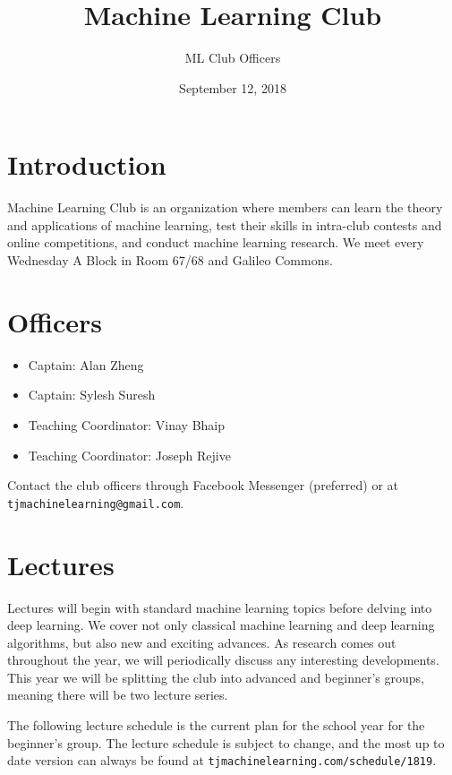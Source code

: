 \documentclass{article}
\title{Machine Learning Club}
\author{ML Club Officers}
\date{September 12, 2018}
\begin{document}
\maketitle

\section{Introduction}
Machine Learning Club is an organization where members can learn the theory and applications of machine learning, test their skills in intra-club contests and online competitions, and conduct machine learning research. We meet every Wednesday A Block in Room 67/68 and Galileo Commons.

\section{Officers}
\begin{itemize}
    \item Captain: Alan Zheng
    \item Captain: Sylesh Suresh
    \item Teaching Coordinator: Vinay Bhaip
    \item Teaching Coordinator: Joseph Rejive
\end{itemize}

Contact the club officers through Facebook Messenger (preferred) or at \texttt{tjmachinelearning@gmail.com}.

\section{Lectures}

Lectures will begin with standard machine learning topics before delving into deep learning. We cover not only classical machine learning and deep learning algorithms, but also new and exciting advances. As research comes out throughout the year, we will periodically discuss any interesting developments. This year we will be splitting the club into advanced and beginner's groups, meaning there will be two lecture series.

The following lecture schedule is the current plan for the school year for the beginner's group. The lecture schedule is subject to change, and the most up to date version can always be found at \texttt{tjmachinelearning.com/schedule/1819}.
\end{document}
